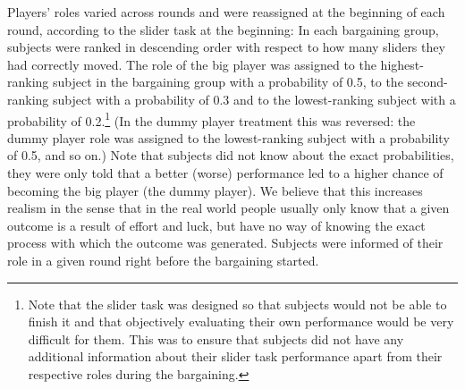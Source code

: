 Players' roles varied across rounds and were reassigned at the beginning of each round, according to the slider task at the beginning: In each bargaining group, subjects were ranked in descending order with respect to how many sliders they had correctly moved. The role of the big player was assigned to the highest-ranking subject in the bargaining group with a probability of 0.5, to the second-ranking subject with a probability of 0.3 and to the lowest-ranking subject with a probability of 0.2.\footnote{Note that the slider task was designed so that subjects would not be able to finish it and that objectively evaluating their own performance would be very difficult for them. This was to ensure that subjects did not have any additional information about their slider task performance apart from their respective roles during the bargaining.} (In the dummy player treatment this was reversed: the dummy player role was assigned to the lowest-ranking subject with a probability of 0.5, and so on.) Note that subjects did not know about the exact probabilities, they were only told that a better (worse) performance led to a higher chance of becoming the big player (the dummy player). We believe that this increases realism in the sense that in the real world people usually only know that a given outcome is a result of effort and luck, but have no way of knowing the exact process with which the outcome was generated. Subjects were informed of their role in a given round right before the bargaining started.


